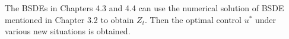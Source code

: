 \documentclass[11pt]{article}
\begin{document}
The BSDEs in Chapters 4.3 and 4.4 can use the numerical solution of BSDE mentioned in Chapter 3.2 to obtain $Z_t$. Then the optimal control $u^*$ under various new situations is obtained.



\end{document}
